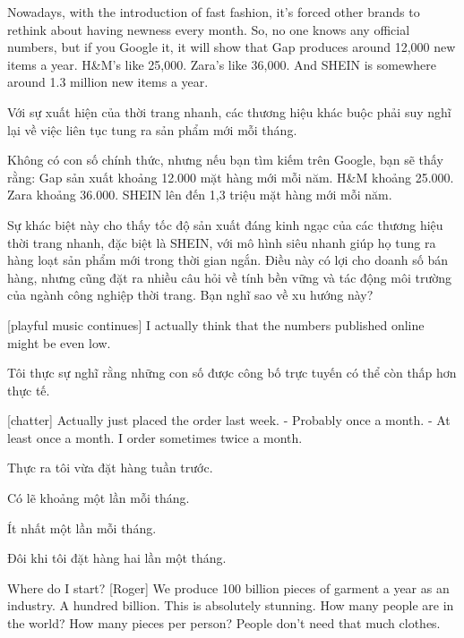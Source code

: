 \documentclass[a4paper]{article}
\begin{document}
	Nowadays, with the introduction of fast fashion, it's forced other brands to rethink about having newness every month.
	So, no one knows any official numbers, but if you Google it, it will show that Gap produces around 12,000 new items a year.
	H\&M's like 25,000.
	Zara's like 36,000.
	And SHEIN is somewhere around 1.3 million new items a year.
	
	\begin{vietnamese-v2}
		Với sự xuất hiện của thời trang nhanh, các thương hiệu khác buộc phải suy nghĩ lại về việc liên tục tung ra sản phẩm mới mỗi tháng.  
		
		Không có con số chính thức, nhưng nếu bạn tìm kiếm trên Google, bạn sẽ thấy rằng:  
		Gap sản xuất khoảng 12.000 mặt hàng mới mỗi năm.  
		H\&M khoảng 25.000.  
		Zara khoảng 36.000.  
		SHEIN lên đến 1,3 triệu mặt hàng mới mỗi năm.  
		
		Sự khác biệt này cho thấy tốc độ sản xuất đáng kinh ngạc của các thương hiệu thời trang nhanh, đặc biệt là SHEIN, với mô hình siêu nhanh giúp họ tung ra hàng loạt sản phẩm mới trong thời gian ngắn. Điều này có lợi cho doanh số bán hàng, nhưng cũng đặt ra nhiều câu hỏi về tính bền vững và tác động môi trường của ngành công nghiệp thời trang. Bạn nghĩ sao về xu hướng này?
	\end{vietnamese-v2}
	
	
	[playful music continues]
	I actually think that the numbers published online might be even low.
	
	\begin{vietnamese-v2}
		
		Tôi thực sự nghĩ rằng những con số được công bố trực tuyến có thể còn thấp hơn thực tế.
	\end{vietnamese-v2}

	[chatter]
	Actually just placed the order last week.
	- Probably once a month. 
	- At least once a month.
	I order sometimes twice a month.
	
	\begin{vietnamese-v2}
		
		Thực ra tôi vừa đặt hàng tuần trước.
		
		Có lẽ khoảng một lần mỗi tháng.
		
		Ít nhất một lần mỗi tháng.
		
		Đôi khi tôi đặt hàng hai lần một tháng.
	\end{vietnamese-v2}
	
	Where do I start?
	[Roger] We produce 100 billion pieces of garment a year as an industry.
	A hundred billion.
	This is absolutely stunning.
	How many people are in the world?
	How many pieces per person? People don't need that much clothes.
	
\end{document}
